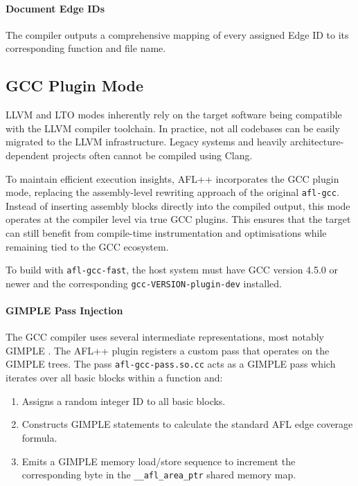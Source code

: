 \paragraph{Document Edge IDs} The compiler outputs a comprehensive mapping of every assigned Edge ID to its corresponding function and file name.

\subsection{GCC Plugin Mode}

LLVM and LTO modes inherently rely on the target software being compatible with the LLVM compiler toolchain. In practice, not all codebases can be easily migrated to the LLVM infrastructure. Legacy systems and heavily architecture-dependent projects often cannot be compiled using Clang.

To maintain efficient execution insights, AFL++ incorporates the GCC plugin mode, replacing the assembly-level rewriting approach of the original \texttt{afl-gcc}. Instead of inserting assembly blocks directly into the compiled output, this mode operates at the compiler level via true GCC plugins. This ensures that the target can still benefit from compile-time instrumentation and optimisations while remaining tied to the GCC ecosystem.

To build with \texttt{afl-gcc-fast}, the host system must have GCC version 4.5.0 or newer and the corresponding \texttt{gcc-VERSION-plugin-dev} installed.

\paragraph{GIMPLE Pass Injection} The GCC compiler uses several intermediate representations, most notably GIMPLE \cite{gccinternals}. The AFL++ plugin registers a custom pass that operates on the GIMPLE trees. The pass \texttt{afl-gcc-pass.so.cc} acts as a GIMPLE pass which iterates over all basic blocks within a function and: 
\begin{enumerate}
    \item Assigns a random integer ID to all basic blocks.

    \item Constructs GIMPLE statements to calculate the standard AFL edge coverage formula.

    \item Emits a GIMPLE memory load/store sequence to increment the corresponding byte in the \texttt{\_\_afl\_area\_ptr} shared memory map.
\end{enumerate}

